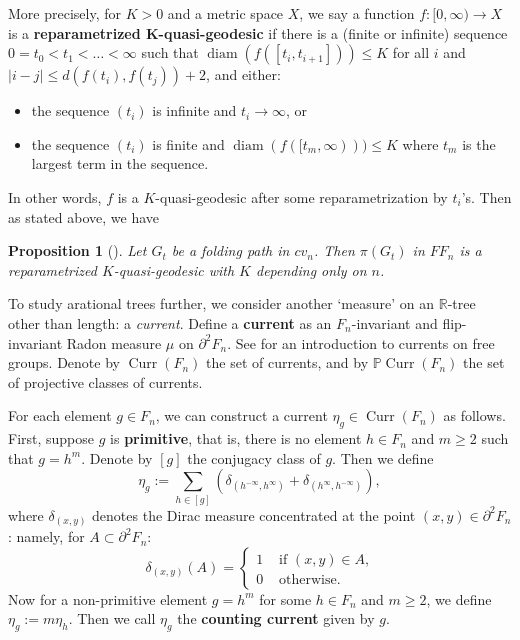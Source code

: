\documentclass[11pt, letterpaper]{amsart}
\theoremstyle{plain}
\newtheorem{proposition}[theorem]{Proposition}
\theoremstyle{definition}
\newcommand{\R}{\mathbb{R}}
\newcommand{\bbP}{\mathbb{P}}
\DeclareMathOperator{\diam}{diam}
\DeclareMathOperator{\Curr}{Curr}
\begin{document}
More precisely, for $K >0$ and a metric space $X$, we say a function $f:[0,\infty) \to X$ is a
\textbf{reparametrized K-quasi-geodesic} if there is a (finite or infinite) sequence $0=t_0<t_1<\ldots<\infty$ such that $\diam(f([t_i,t_{i+1}]))
\le K$ for all $i$ and $|i-j| \le d(f(t_i),f(t_j))+2$, and either:
\begin{itemize}
\item the sequence $(t_i)$ is infinite and $t_i \to \infty$, or
\item the sequence $(t_i)$ is finite and $\diam(f([t_m,\infty))) \le K$ where
  $t_m$ is the largest term in the sequence.
\end{itemize}
In other words, $f$ is a $K$-quasi-geodesic after some reparametrization by
$t_i$'s. Then as stated above, we have 
\begin{proposition}[{\cite[Corollary 6.5 and Proposition 9.2]{bestvina2014hyperbolicity}}]
  \label{prop:projectionQG}
  Let $G_t$ be a folding path in $cv_n$. Then $\pi(G_t)$ in $FF_n$ is a reparametrized $K$-quasi-geodesic
  with $K$ depending only on $n$.
\end{proposition}

To study arational trees further, we consider another `measure' on an
$\R$-tree other than length: a \emph{current}. 
Define a \textbf{current} as an $F_n$-invariant and flip-invariant Radon measure $\mu$ on
$\partial^2F_n$. See \cite{reiner:thesis,ilya:currents} for an
introduction to currents on free groups.
Denote by $\Curr(F_n)$ the set of currents, and by
$\bbP\Curr(F_n)$ the set of projective classes of currents.

For each element $g \in F_n$, we can construct a current $\eta_g \in \Curr(F_n)$
as follows. First, suppose $g$ is \textbf{primitive}, that is, there is no
element $h \in F_n$ and $m \ge 2$ such that $g=h^m$. Denote by $[g]$ the
conjugacy class of $g$. Then we define
\[
  \eta_g := \sum_{h \in [g]}\left( \delta_{(h^{-\infty},h^\infty)} +
    \delta_{(h^{\infty}, h^{-\infty})} \right),
\]
where $\delta_{(x,y)}$ denotes the Dirac measure concentrated at the point
$(x,y) \in \partial^2F_n$: namely, for $A \subset \partial^2F_n$:
\[
  \delta_{(x,y)}(A) =
  \begin{cases}
    1 & \text{ if $(x,y) \in A$,}\\
    0 & \text{ otherwise}.
  \end{cases}
\]
Now for a non-primitive element $g = h^m$ for some $h \in F_n$ and $m \ge 2$, we
define $\eta_g := m\eta_h$. Then we call $\eta_g$ the \textbf{counting current}
given by $g$.
\end{document}
